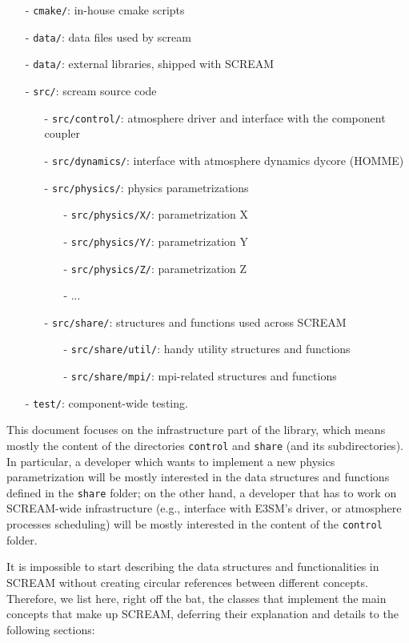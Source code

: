 \documentclass[10pt]{article}
\begin{document}
\begin{itemize}
\item [-] \verb|cmake/|: in-house cmake scripts
\item [-] \verb|data/|: data files used by scream
\item [-] \verb|data/|: external libraries, shipped with SCREAM
\item [-] \verb|src/|: scream source code
\begin{itemize}
\item [-] \verb|src/control/|: atmosphere driver and interface with the component coupler
\item [-] \verb|src/dynamics/|: interface with atmosphere dynamics dycore (HOMME)
\item [-] \verb|src/physics/|: physics parametrizations
\begin{itemize}
\item [-] \verb|src/physics/X/|: parametrization X
\item [-] \verb|src/physics/Y/|: parametrization Y
\item [-] \verb|src/physics/Z/|: parametrization Z
\item [-] ...
\end{itemize}
\item [-] \verb|src/share/|: structures and functions used across SCREAM
\begin{itemize}
\item [-] \verb|src/share/util/|: handy utility structures and functions
\item [-] \verb|src/share/mpi/|: mpi-related structures and functions
\end{itemize}
\end{itemize}
\item [-] \verb|test/|: component-wide testing.
\end{itemize}

This document focuses on the infrastructure part of the library, which means mostly
the content of the directories \verb|control| and \verb|share| (and its subdirectories).
In particular, a developer which wants to implement a new physics parametrization
will be mostly interested in the data structures and functions defined in the \verb|share| folder;
on the other hand, a developer that has to work on SCREAM-wide infrastructure (e.g.,
interface with E3SM's driver, or atmosphere processes scheduling) will be mostly
interested in the content of the \verb|control| folder.

It is impossible to start describing the data structures and functionalities in SCREAM
without creating circular references between different concepts. Therefore, we list
here, right off the bat, the classes that implement the main concepts that make up SCREAM,
deferring their explanation and details to the following sections:
\end{document}
